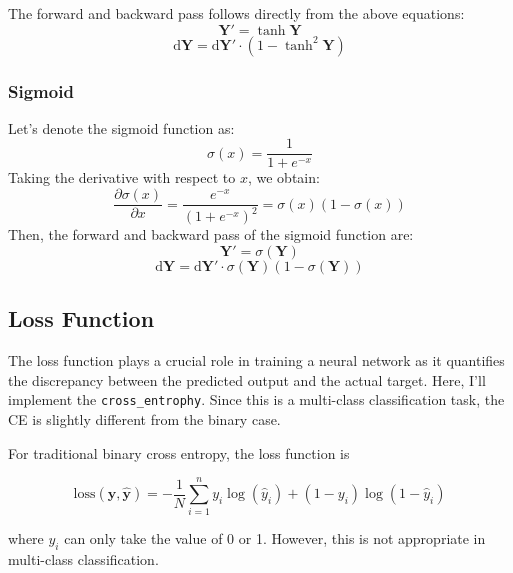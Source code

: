 \documentclass[10pt,a4paper,twoside]{tau}
\renewcommand{\vec}[1]{\mathbf{#1}}
\renewcommand{\d}{\text{d}}
\begin{document}
The forward and backward pass follows directly from the above equations:
\begin{equation}
\vec{Y'} = \tanh{\vec{Y}} \tag{3.2.5}
\end{equation}
\begin{equation}
\d\vec{Y} = \d\vec{Y'}\cdot(1 - \tanh^2\vec{Y}) \tag{3.2.6}
\end{equation}

\subsubsection{Sigmoid}

Let's denote the sigmoid function as:
\begin{equation}
\sigma(x) = \frac{1}{1 + e^{-x}} \tag{3.2.7}
\end{equation}
Taking the derivative with respect to $x$, we obtain:
\begin{equation}
\frac{\partial\sigma(x)}{\partial x} = \frac{e^{-x}}{(1 + e^{-x})^2} = \sigma(x)(1 - \sigma(x)) \tag{3.2.8}
\end{equation}
Then, the forward and backward pass of the sigmoid function are:
\begin{equation}
\vec{Y'} = \sigma(\vec{Y}) \tag{3.2.9}
\end{equation}
\begin{equation}
\d\vec{Y} = \d\vec{Y'}\cdot \sigma(\vec{Y}) (1 - \sigma(\vec{Y})) \tag{3.2.10}
\end{equation}

\subsection{Loss Function}

The loss function plays a crucial role in training a neural network as it quantifies the discrepancy between the predicted output and the actual target. Here, I'll implement the \texttt{cross\_entrophy}. Since this is a multi-class classification task, the CE is slightly different from the binary case.

For traditional binary cross entropy, the loss function is

\begin{equation}
    \text{loss}(\vec{y}, \vec{\hat{y}}) = -\frac{1}{N} \sum_{i=1}^{n}y_i
    \log(\hat{y}_i) + (1 - y_i) \log(1 - \hat{y}_i) \tag{3.3.1}
\end{equation}

where $y_i$ can only take the value of 0 or 1. However, this is not appropriate in multi-class classification.
\end{document}
